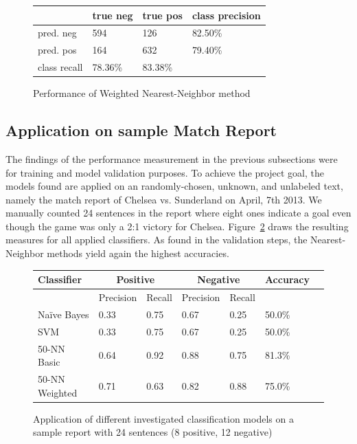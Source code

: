 \documentclass[11pt,titlepage,oneside,openany]{book}
\begin{document}
\begin{figure} [h!]
\centering
\begin{tabular}{ | l | l | l | l | }
\hline
	 & true neg & true pos & class precision \\ \hline
	pred. neg & 594 & 126 & 82.50\% \\ \hline
	pred. pos & 164 & 632 & 79.40\% \\ \hline
	class recall & 78.36\% & 83.38\% &  \\ \hline
\end{tabular}
\caption{Performance of Weighted Nearest-Neighbor method}
\label{fig.wknn}
\end{figure}

\subsection{Application on sample Match Report}

The findings of the performance measurement in the previous subsections were for training and model validation purposes. To achieve the project goal, the models found are applied on an randomly-chosen, unknown, and unlabeled text, namely the match report of Chelsea vs. Sunderland on April, 7th 2013. We manually counted 24 sentences in the report where eight ones indicate a goal even though the game was only a 2:1 victory for Chelsea. Figure~\ref{fig.appliedmodel} draws the resulting measures for all applied classifiers. As found in the validation steps, the Nearest-Neighbor methods yield again the highest accuracies.


\begin{figure} [h!]
\centering
\begin{tabular}{ | l | l | l | l | l | l | l | }
\hline
	Classifier & \multicolumn{2}{|c|}{Positive} &  \multicolumn{2}{|c|}{Negative} & Accuracy \\ \hline
	& Precision & Recall & Precision & Recall & \  \\ \hline
	Na\"{i}ve Bayes & 0.33 & 0.75 & 0.67 & 0.25 & 50.0\% \\ \hline
	SVM & 0.33 & 0.75 & 0.67 & 0.25 & 50.0\% \\ \hline
	50-NN Basic & 0.64 & 0.92 & 0.88 & 0.75 & 81.3\% \\ \hline
	50-NN Weighted  & 0.71 & 0.63 & 0.82 & 0.88 & 75.0\% \\ \hline
\end{tabular}
\caption{Application of different investigated classification models on a sample report with 24 sentences (8 positive, 12 negative)}
\label{fig.appliedmodel}
\end{figure}
\end{document}
